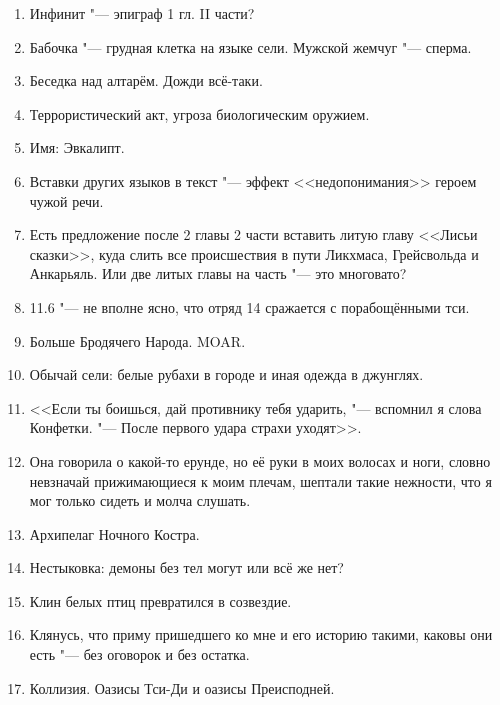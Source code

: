 \begin{enumerate}
\item Инфинит "--- эпиграф 1 гл. II части?

\item Бабочка "--- грудная клетка на языке сели.
Мужской жемчуг "--- сперма.

\item Беседка над алтарём.
Дожди всё-таки.

\item Террористический акт, угроза биологическим оружием.

\item Имя: Эвкалипт.

\item Вставки других языков в текст "--- эффект <<недопонимания>> героем чужой речи.

\item Есть предложение после 2 главы 2 части вставить литую главу <<Лисьи сказки>>, куда слить все происшествия в пути Ликхмаса, Грейсвольда и Анкарьяль.
Или две литых главы на часть "--- это многовато?

\item 11.6 "--- не вполне ясно, что отряд 14 сражается с порабощёнными тси.

\item Больше Бродячего Народа.
MOAR.

\item Обычай сели: белые рубахи в городе и иная одежда в джунглях.

\item <<Если ты боишься, дай противнику тебя ударить, "--- вспомнил я слова Конфетки.
"--- После первого удара страхи уходят>>.

\item Она говорила о какой-то ерунде, но её руки в моих волосах и ноги, словно невзначай прижимающиеся к моим плечам, шептали такие нежности, что я мог только сидеть и молча слушать.

\item Архипелаг Ночного Костра.

\item Нестыковка: демоны без тел могут или всё же нет?

\item Клин белых птиц превратился в созвездие.

\item Клянусь, что приму пришедшего ко мне и его историю такими, каковы они есть "--- без оговорок и без остатка.

\item Коллизия. Оазисы Тси-Ди и оазисы Преисподней.


\end{enumerate}
